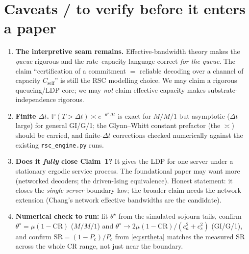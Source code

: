 \documentclass[11pt]{article}
\newcommand{\Cself}{C_{\mathrm{self}}}
\newcommand{\CR}{\mathrm{CR}}
\newcommand{\SR}{\mathrm{SR}}
\newcommand{\Prob}{\mathbb{P}}
\begin{document}
\section{Caveats / to verify before it enters a paper}
\begin{enumerate}
\item \textbf{The interpretive seam remains.} Effective-bandwidth theory makes the \emph{queue} rigorous
and the rate--capacity language correct \emph{for the queue}. The claim ``certification of a commitment
$=$ reliable decoding over a channel of capacity $\Cself$'' is still the RSC modelling choice. We may
claim a rigorous queueing/LDP core; we may \emph{not} claim effective capacity makes substrate-independence
rigorous.
\item \textbf{Finite $\Delta t$.} $\Prob(T>\Delta t)\asymp e^{-\theta^\star\Delta t}$ is exact for $M/M/1$
but asymptotic ($\Delta t$ large) for general GI/G/1; the Glynn--Whitt constant prefactor (the $\asymp$)
should be carried, and finite-$\Delta t$ corrections checked numerically against the existing
\texttt{rsc\_engine.py} runs.
\item \textbf{Does it \emph{fully} close Claim~1?} It gives the LDP for one server under a stationary
ergodic service process. The foundational paper may want more (networked decoders; the driven-Ising
equivalence). Honest statement: it closes the \emph{single-server} boundary law; the broader claim needs
the network extension (Chang's network effective bandwidths are the candidate).
\item \textbf{Numerical check to run:} fit $\theta^\star$ from the simulated sojourn tails, confirm
$\theta^\star=\mu(1-\CR)$ ($M/M/1$) and $\theta^\star\to 2\mu(1-\CR)/(c_a^2+c_s^2)$ (GI/G/1), and confirm
$\SR=(1-P_c)/P_c$ from \eqref{eq:srtheta} matches the measured $\SR$ across the whole $\CR$ range, not just
near the boundary.
\end{enumerate}
\end{document}
